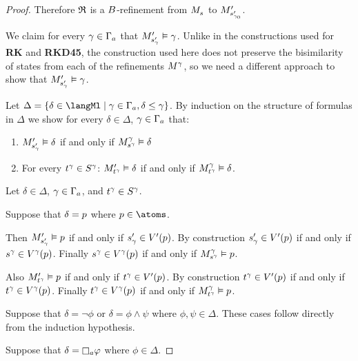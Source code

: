 \begin{proof}
Therefore $\refinement$ is a $\agentsB$-refinement from $\kPModel{\kStateS}$ to $\kPModelP{\kStateSP_{\gamma_0}}$.

We claim for every $\gamma \in \Gamma_\agentA$ that $\kPModelP{\kStateSP_\gamma} \entails \gamma$.
Unlike in the constructions used for {\bf RK} and {\bf RKD45}, the construction used here does not preserve the bisimilarity of states from each of the refinements $\kModel[\gamma]$, so we need a different approach to show that $\kPModelP{\kStateSP_\gamma} \entails \gamma$.

Let $\Delta = \{\delta \in \langMl \mid \gamma \in \Gamma_\agentA, \delta \leq \gamma\}$.
By induction on the structure of formulas in $\Delta$ we show for every $\delta \in \Delta$, $\gamma \in \Gamma_\agentA$ that:
\begin{enumerate}
    \item $\kPModelP{\kStateSP_\gamma} \entails \delta$ if and only if $\kPModel[\gamma]{\kStateS[\gamma]} \entails \delta$
    \item For every $\kStateT[\gamma] \in \kStates[\gamma]$: $\kPModelP{\kStateT[\gamma]} \entails \delta$ if and only if $\kPModel[\gamma]{\kStateT[\gamma]} \entails \delta$.
\end{enumerate}

Let $\delta \in \Delta$, $\gamma \in \Gamma_\agentA$, and $\kStateT[\gamma] \in \kStates[\gamma]$.

Suppose that $\delta = \atomP$ where $\atomP \in \atoms$.

Then $\kPModelP{\kStateSP_\gamma} \entails \atomP$ if and only if $\kStateSP_\gamma \in \kValuationP(\atomP)$.
By construction $\kStateSP_\gamma \in \kValuationP(\atomP)$ if and only if $\kStateS[\gamma] \in \kValuation[\gamma](\atomP)$.
Finally $\kStateS[\gamma] \in \kValuation[\gamma](\atomP)$ if and only if $\kPModel[\gamma]{\kStateS[\gamma]} \entails \atomP$.

Also $\kPModelP{\kStateT[\gamma]} \entails \atomP$ if and only if $\kStateT[\gamma] \in \kValuationP(\atomP)$.
By construction $\kStateT[\gamma] \in \kValuationP(\atomP)$ if and only if $\kStateT[\gamma] \in \kValuation[\gamma](\atomP)$.
Finally $\kStateT[\gamma] \in \kValuation[\gamma](\atomP)$ if and only if $\kPModel[\gamma]{\kStateT[\gamma]} \entails \atomP$.

Suppose that $\delta = \lnot \phi$ or $\delta = \phi \land \psi$ where $\phi, \psi \in \Delta$.
These cases follow directly from the induction hypothesis.

Suppose that $\delta = \necessaryA \phi$ where $\phi \in \Delta$. 


\end{proof}
